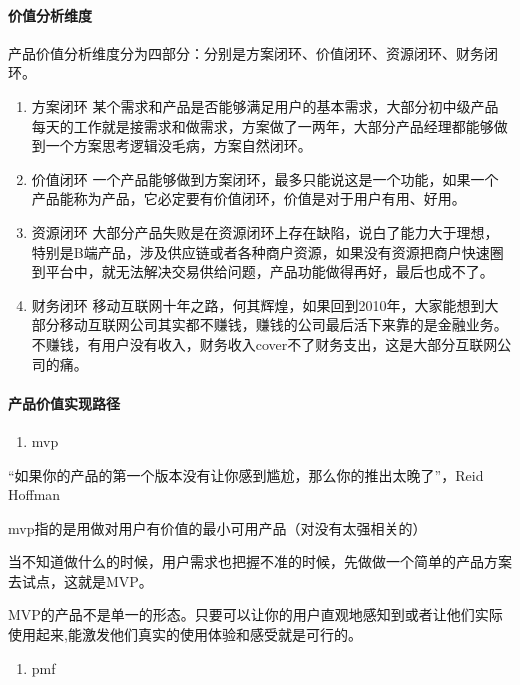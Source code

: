 \documentclass[letterpaper,10pt,english]{sphinxmanual}
\begin{document}
\paragraph{价值分析维度}
\label{\detokenize{chapter_project/valuable:id3}}
产品价值分析维度分为四部分：分别是方案闭环、价值闭环、资源闭环、财务闭环。
\begin{enumerate}
%
\item {} 
方案闭环
某个需求和产品是否能够满足用户的基本需求，大部分初中级产品每天的工作就是接需求和做需求，方案做了一两年，大部分产品经理都能够做到一个方案思考逻辑没毛病，方案自然闭环。

\item {} 
价值闭环
一个产品能够做到方案闭环，最多只能说这是一个功能，如果一个产品能称为产品，它必定要有价值闭环，价值是对于用户有用、好用。

\item {} 
资源闭环
大部分产品失败是在资源闭环上存在缺陷，说白了能力大于理想，特别是B端产品，涉及供应链或者各种商户资源，如果没有资源把商户快速圈到平台中，就无法解决交易供给问题，产品功能做得再好，最后也成不了。

\item {} 
财务闭环
移动互联网十年之路，何其辉煌，如果回到2010年，大家能想到大部分移动互联网公司其实都不赚钱，赚钱的公司最后活下来靠的是金融业务。不赚钱，有用户没有收入，财务收入cover不了财务支出，这是大部分互联网公司的痛。

\end{enumerate}


\paragraph{产品价值实现路径}
\label{\detokenize{chapter_project/valuable:id4}}\begin{enumerate}
%
\item {} 
mvp

\end{enumerate}

“如果你的产品的第一个版本没有让你感到尴尬，那么你的推出太晚了”，Reid
Hoffman

mvp指的是用做对用户有价值的最小可用产品（对没有太强相关的）

当不知道做什么的时候，用户需求也把握不准的时候，先做做一个简单的产品方案去试点，这就是MVP。

MVP的产品不是单一的形态。只要可以让你的用户直观地感知到或者让他们实际使用起来,能激发他们真实的使用体验和感受就是可行的。
\begin{enumerate}
%
\item {} 
pmf

\end{enumerate}
\end{document}
